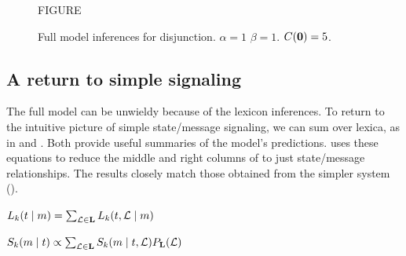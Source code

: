 \documentclass{article}
\begin{document}
\begin{figure}[tp]
  \centering
FIGURE
   \caption{Full model inferences for disjunction. $\alpha = 1$
   $\beta = 1$. $C(\mathbf{0}) = 5$.
   }
  \label{fig:full-disj}
\end{figure}


\subsection{A return to simple signaling}\label{sec:return}

The full model can be unwieldy because of the lexicon inferences. To
return to the intuitive picture of simple state/message signaling, we
can sum over lexica, as in  and . Both provide
useful summaries of the model's predictions.  uses
these equations to reduce the middle and right columns of
 to just state/message relationships. The
results closely match those obtained from the simpler system
().
%
\begin{examples}
\item\label{lisnorm}%
  $L_{k}(t \mid m)  = 
  \sum_{\mathcal{L} \in \mathbf{L}} L_{k}(t, \mathcal{L} \mid m)$
\item\label{spknorm}%
  $S_{k}(m \mid t) \propto 
  \sum_{\mathcal{L} \in \mathbf{L}} S_{k}(m \mid t, \mathcal{L})
  P_{\mathbf{L}}(\mathcal{L})$
\end{examples}
\end{document}
